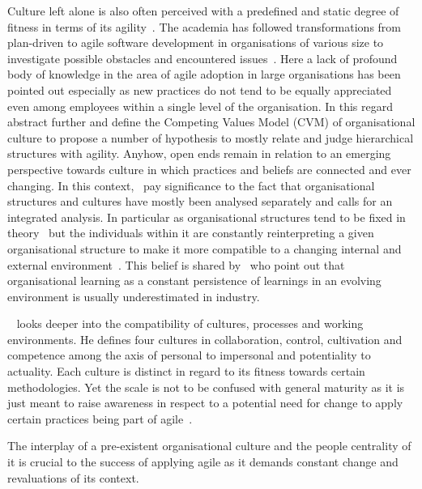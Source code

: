 Culture left alone is also often perceived with a predefined and static degree of fitness in terms of its agility~\citep{ivari2011orgagile}. The academia has followed transformations from plan-driven to agile software development in organisations of various size to investigate possible obstacles and encountered issues~\citep{laanti2011nokia}. Here a lack of profound body of knowledge in the area of agile adoption in large organisations has been pointed out especially as new practices do not tend to be equally appreciated even among employees within a single level of the organisation. In this regard~\citet{ivari2011orgagile} abstract further and define the Competing Values Model (CVM) of organisational culture to propose a number of hypothesis to mostly relate and judge hierarchical structures with agility. Anyhow, open ends remain in relation to an emerging perspective towards culture in which practices and beliefs are connected and ever changing. In this context,~\citet{gallivan2005persculture} pay significance to the fact that organisational structures and cultures have mostly been analysed separately and calls for an integrated analysis. In particular as organisational structures tend to be fixed in theory~\citep{gallivan2005persculture} but the individuals within it are constantly reinterpreting a given organisational structure to make it more compatible to a changing internal and external environment~\citep{iivari2010usability}. This belief is shared by~\citet{robey2000learning} who point out that organisational learning as a constant persistence of learnings in an evolving environment is usually underestimated in industry.

~\citet{schneider2000regeineering} looks deeper into the compatibility of cultures, processes and working environments. He defines four cultures in collaboration, control, cultivation and competence among the axis of personal to impersonal and potentiality to actuality. Each culture is distinct in regard to its fitness towards certain methodologies. Yet the scale is not to be confused with general maturity as it is just meant to raise awareness in respect to a potential need for change to apply certain practices being part of agile~\citep{schneider2000regeineering}.

The interplay of a pre-existent organisational culture and the people centrality of it is crucial to the success of applying agile as it demands constant change and revaluations of its context.